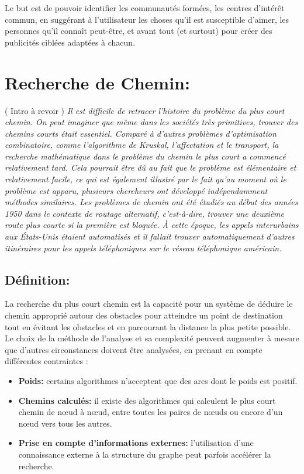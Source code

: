 Le but est de pouvoir identifier les communautés formées, les centres d'intérêt commun, en suggérant à l'utilisateur les choses qu'il est susceptible d'aimer, les personnes qu'il connaît peut-être, et avant tout (et surtout) pour créer des publicités ciblées adaptées à chacun.


\section{Recherche de Chemin:}
( Intro à revoir ) \newline
\emph{Il est difficile de retracer l'histoire du problème du plus court chemin. On peut imaginer que même dans les sociétés très primitives, trouver des chemins courts était essentiel. Comparé à d'autres problèmes d'optimisation combinatoire, comme l'algorithme de Kruskal, l'affectation et le transport, la recherche mathématique dans le problème du chemin le plus court a commencé relativement tard. Cela pourrait être dû au fait que le problème est élémentaire et relativement facile, ce qui est également illustré par le fait qu'au moment où le problème est apparu, plusieurs chercheurs ont développé indépendamment méthodes similaires.
Les problèmes de chemin ont été étudiés au début des années 1950 dans le contexte de \emph{routage alternatif}, c'est-à-dire, trouver une deuxième route plus courte si la première est bloquée. À cette époque, les appels interurbains aux États-Unis étaient automatisés et il fallait trouver automatiquement d'autres itinéraires pour les appels téléphoniques sur le réseau téléphonique américain.
}

\subsection{Définition:}
La recherche du plus court chemin est la capacité pour un système de déduire le chemin approprié autour des obstacles pour atteindre un point de destination tout en évitant les obstacles et en parcourant la distance la plus petite possible.
Le choix de la méthode de l'analyse et sa complexité peuvent augmenter à mesure que d'autres circonstances doivent être analysées, en prenant en compte différentes contraintes :

\begin{itemize}
	\item \textbf{Poids:} certains algorithmes n'acceptent que des arcs dont le poids est positif.
	\item \textbf{Chemins calculés:} il existe des algorithmes qui calculent le plus court chemin de nœud à nœud, entre toutes les paires de nœuds ou encore d'un nœud vers tous les autres.
	\item \textbf{Prise en compte d'informations externes:} l'utilisation d'une connaissance externe à la structure du graphe peut parfois accélérer la recherche.
\end{itemize}

